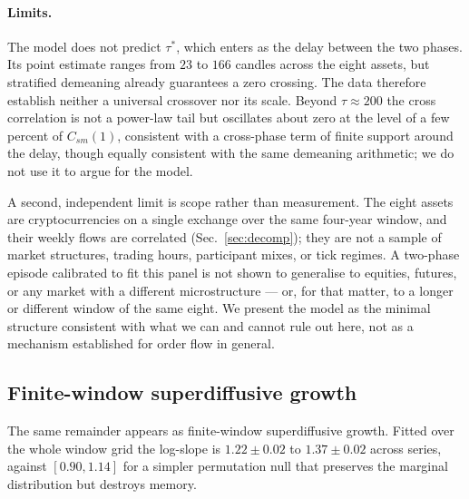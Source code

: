 \documentclass[aps,pre,twocolumn,superscriptaddress,floatfix,nofootinbib]{revtex4-2}
\begin{document}
\paragraph*{Limits.}
The model does not predict $\tau^*$, which enters as the delay between the two
phases. Its point estimate ranges from $23$ to $166$ candles across the eight
assets, but stratified demeaning already guarantees a zero crossing. The data
therefore establish neither a universal crossover nor its scale. Beyond
$\tau\approx200$
the cross correlation is not a power-law tail but oscillates about zero at the
level of a few percent of $C_{sm}(1)$, consistent with a cross-phase term of
finite support around the delay, though equally consistent with the same
demeaning arithmetic; we do not use it to argue for the model.

A second, independent limit is scope rather than measurement. The eight assets
are cryptocurrencies on a single exchange over the same four-year window, and
their weekly flows are correlated (Sec.~\ref{sec:decomp}); they are not a
sample of market structures, trading hours, participant mixes, or tick
regimes. A two-phase episode calibrated to fit this panel is not shown to
generalise to equities, futures, or any market with a different microstructure
--- or, for that matter, to a longer or different window of the same eight.
We present the model as the minimal structure consistent with what we can and
cannot rule out here, not as a mechanism established for order flow in
general.

\fi

\subsection{Finite-window superdiffusive growth}

The same remainder appears as finite-window superdiffusive growth. Fitted over the whole
window grid the log-slope is $1.22\pm0.02$ to $1.37\pm0.02$ across series,
against $[0.90,1.14]$ for a simpler permutation null that preserves the
marginal distribution but destroys memory.
\end{document}
